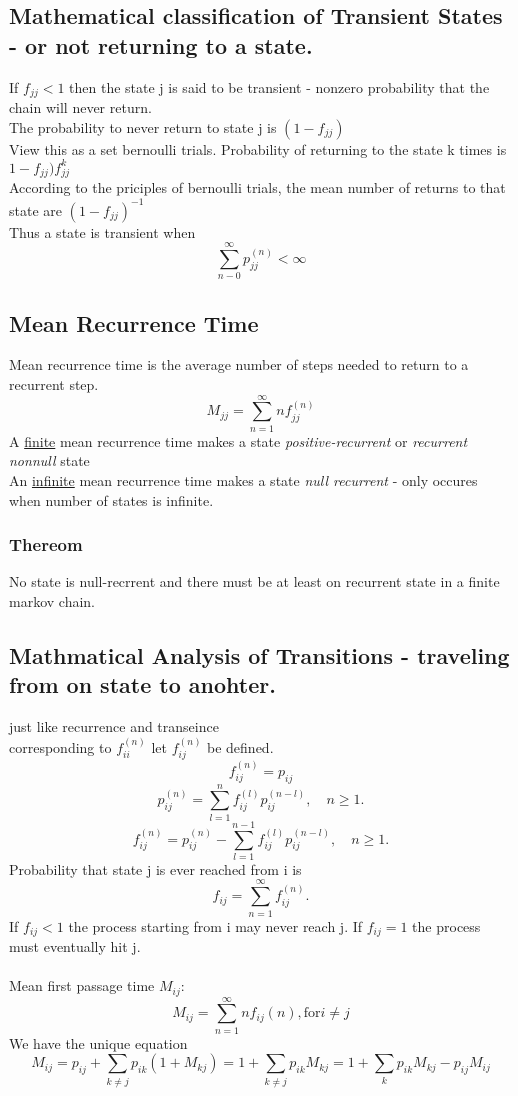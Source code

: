 \documentclass{article}
\begin{document}
	\subsection{Mathematical classification of Transient States - or not returning to a state.}
	If \(f_{jj} < 1 \) then the state j is said to be transient - nonzero probability that the chain will never return. 
	\\The probability to never return to state j is \(( 1 - f_{jj})\)
	\\View this as a set bernoulli trials. Probability of returning to the state k times is \(1-f_{jj})f_{jj}^{k}\)
	\\According to the priciples of bernoulli trials, the mean number of returns to that state are \((1-f_{jj})^{-1}\) 
	\\Thus a state is transient when 
	\[ \sum\limits_{n-0}^{\infty}{p_{jj}^{(n)}} < \infty \]
	\subsection{Mean Recurrence Time}
	Mean recurrence time is the average number of steps needed to return to a recurrent step. 
	\[M_{jj} = \sum\limits_{n=1}^{\infty}{nf_{jj}^{(n)}}\]
	A \underline{finite} mean recurrence time makes a state \textit{positive-recurrent} or \textit{recurrent nonnull}  state
	\\An \underline{infinite} mean recurrence time makes a state \textit{null recurrent} - only occures when number of states is infinite.
	\subsubsection{Thereom}
	No state is null-recrrent and there must be at least on recurrent state in a finite markov chain.
	
	 
	\subsection{Mathmatical Analysis of Transitions - traveling from on state to anohter. }
	just like recurrence and transeince
	\\corresponding to \(f_{ii}^{(n)}\) let \(f_{ij}^{(n)}\) be defined.
	\[f_{ij}^{(n)} = p_{ij}\]
	\[  p_{ij}^{(n)} = \sum\limits_{l=1}^{n}{f_{ij}^{(l)}p_{ij}^{(n-l)}}, \quad n \geq 1.\]
	\[  f_{ij}^{(n)} = p_{ij}^{(n)} - \sum\limits_{l=1}^{n-1}{f_{ij}^{(l)}p_{ij}^{(n-l)}}, \quad n \geq 1. \]
	Probability that state j is ever reached from i is 
	\[ f_{ij} = \sum\limits_{n=1}^{\infty}{f_{ij}^{(n)}}.\]
	If $f_{ij} < 1$ the process starting from i may never reach j. If $f_{ij} = 1$ the process must eventually hit j.
	\\
	\\Mean first passage time $M_{ij}$:
	\[ M_{ij}=\sum\limits_{n=1}^{\infty}{nf_{ij}{(n)}}, \mbox{for} i \neq j \]
	We have the unique equation 
	\[ M_{ij} = p_{ij} + \sum\limits_{k\neq j}{p_{ik}(1 + M_{kj})} = 1 + \sum\limits_{k \neq j}p_{ik}M_{kj} = 1 + \sum\limits_{k}{p_{ik}M_{kj}} - p_{ij}M_{ij}  \]
\end{document}
